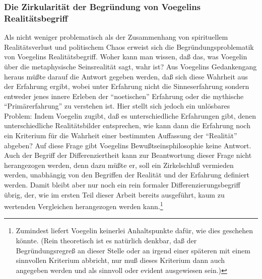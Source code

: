 \subsubsection{Die Zirkularität der Begründung von Voegelins Realitätsbegriff}

Als nicht weniger problematisch als der Zusammenhang von spirituellem
Realitätsverlust und politischem Chaos erweist sich die
Begründungsproblematik von Voegelins Realitätsbegriff. Woher kann man
wissen, daß das, was Voegelin über die metaphysische Seinsrealität sagt,
wahr ist? Aus Voegelins Gedankengang heraus müßte darauf die Antwort
gegeben werden, daß sich diese Wahrheit aus der Erfahrung ergibt, wobei
unter Erfahrung nicht die Sinneserfahrung sondern entweder jenes innere
Erleben der "`noetischen"' Erfahrung oder die mythische
"`Primärerfahrung"' zu verstehen ist. Hier stellt sich jedoch ein
unlösbares Problem: Indem Voegelin zugibt, daß es unterschiedliche
Erfahrungen gibt, denen unterschiedliche Realitätsbilder entsprechen,
wie kann dann die Erfahrung noch ein Kriterium für die Wahrheit einer
bestimmten Auffassung der "`Realität"' abgeben? Auf diese Frage gibt
Voegelins Bewußtseinsphilosophie keine Antwort. Auch der Begriff der
Differenziertheit kann zur Beantwortung dieser Frage nicht herangezogen
werden, denn dazu müßte er, soll ein Zirkelschluß vermieden werden,
unabhängig von den Begriffen der Realität und der Erfahrung definiert
werden. Damit bleibt aber nur noch ein rein formaler
Differenzierungsbegriff übrig, der, wie im ersten Teil dieser Arbeit
bereits ausgeführt, kaum zu wertenden Vergleichen herangezogen werden
kann.\footnote{Zumindest liefert Voegelin keinerlei Anhaltspunkte dafür,
  wie dies geschehen könnte. (Rein theoretisch ist es natürlich denkbar,
  daß der Begründungsregreß an dieser Stelle oder an irgend einer
  späteren mit einem sinnvollen Kriterium abbricht, nur muß dieses
  Kriterium dann auch angegeben werden und als sinnvoll oder evident
  ausgewiesen sein.)}

